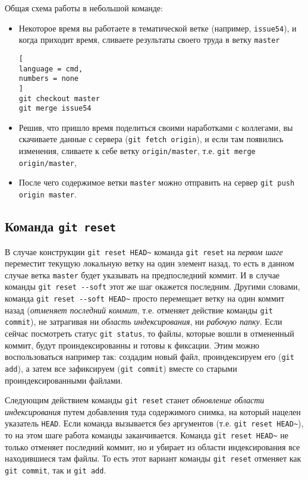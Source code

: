 \documentclass[%
	11pt,
	a4paper,
	utf8,
		]{article}
\begin{document}
Общая схема работы в небольшой команде:
\begin{itemize}
	\item Некоторое время вы работаете в тематической ветке (например, \texttt{issue54}), и когда приходит время, сливаете результаты своего труда в ветку \texttt{master}
	
\begin{lstlisting}[
language = cmd,
numbers = none
]
git checkout master
git merge issue54
\end{lstlisting}
	
	\item Решив, что пришло время поделиться своими наработками с коллегами, вы скачиваете данные с сервера (\texttt{git fetch origin}), и если там появились изменения, сливаете к себе ветку \texttt{origin/master}, т.е. \texttt{git merge origin/master},
	
	\item После чего содержимое ветки \texttt{master} можно отправить на сервер \texttt{git push origin master}.
\end{itemize}

\subsection{Команда \texttt{git reset}}

В случае конструкции \texttt{git reset HEAD\~} команда \texttt{git reset} на \emph{первом шаге} переместит текущую локальную ветку на один элемент назад, то есть в данном случае ветка \texttt{master} будет указывать на предпоследний коммит. И в случае команды \verb|git reset --soft| этот же шаг окажется последним. Другими словами, команда \verb|git reset --soft HEAD~| просто перемещает ветку на один коммит назад (\emph{отменяет последний коммит}, т.е. отменяет действие команды \texttt{git commit}), не затрагивая ни \emph{область индексирования}, ни \emph{рабочую папку}. Если сейчас посмотреть статус \texttt{git status}, то файлы, которые вошли в отмененный коммит, будут проиндексированны и готовы к фиксации. Этим можно воспользоваться например так: создадим новый файл, проиндексируем его (\texttt{git add}), а затем все зафиксируем (\texttt{git commit}) вместе со старыми проиндексированными файлами.

Следующим действием команды \texttt{git reset} станет \emph{обновление области индексирования} путем добавления туда содержимого снимка, на который нацелен указатель \texttt{HEAD}. Если команда вызывается без аргументов (т.е. \texttt{git reset HEAD\~}), то на этом шаге работа команды заканчивается. Команда \texttt{git reset HEAD\~} не только отменяет последний коммит, но и убирает из области индексирования все находившиеся там файлы. То есть этот вариант команды \texttt{git reset} отменяет как \texttt{git commit}, так и \texttt{git add}.
\end{document}
